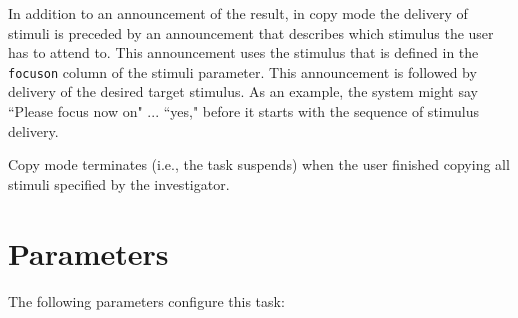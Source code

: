 \documentclass[letterpaper,oneside,12pt]{article}
\begin{document}
In addition to an announcement of the result, in copy mode the delivery of 
stimuli is preceded by an announcement that describes which stimulus the user
has to attend to. This announcement uses the stimulus that is defined in the
\texttt{focuson} column of the stimuli parameter. This announcement is followed by
delivery of the desired target stimulus. As an example, the system might say
``Please focus now on" ... ``yes," before it starts with the sequence of
stimulus delivery.

Copy mode terminates (i.e., the task suspends) when the user finished copying 
all stimuli specified by the investigator.

\section{Parameters}
The following parameters configure this task:
\end{document}
